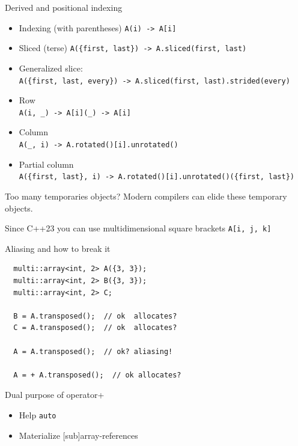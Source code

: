 \begin{frame}[fragile]{Derived and positional indexing}
\begin{itemize}
  \item Indexing (with parentheses)
    \lstinline|A(i) -> A[i]|
  \item Sliced (terse)
    \lstinline|A({first, last}) -> A.sliced(first, last)|
  \item Generalized slice:\\
    \lstinline|A({first, last, every}) -> A.sliced(first, last).strided(every)|
  \item Row\\
    \lstinline|A(i, _) -> A[i](_) -> A[i]| \\
  \item Column\\
    \lstinline|A(_, i) -> A.rotated()[i].unrotated()| \\
  \item Partial column\\
    \lstinline|A({first, last}, i) -> A.rotated()[i].unrotated()({first, last})| \\
\end{itemize}

\begin{block}{Too many temporaries objects?}
Modern compilers can elide these temporary objects.
\end{block}

\begin{alertblock}{}
  Since C++23 you can use multidimensional square brackets \lstinline|A[i, j, k]|
\end{alertblock}
\end{frame}

\begin{frame}[fragile]{Aliasing and how to break it}
\begin{lstlisting}
  multi::array<int, 2> A({3, 3});
  multi::array<int, 2> B({3, 3});
  multi::array<int, 2> C;

  B = A.transposed();  // ok  allocates?
  C = A.transposed();  // ok  allocates?

  A = A.transposed();  // ok? aliasing!

  A = + A.transposed();  // ok allocates?
\end{lstlisting}

\begin{alertblock}{Dual purpose of operator+}
  \begin{itemize}
    \item Help \texttt{auto}
    \item Materialize [sub]array-references
  \end{itemize}
\end{alertblock}
\end{frame}


